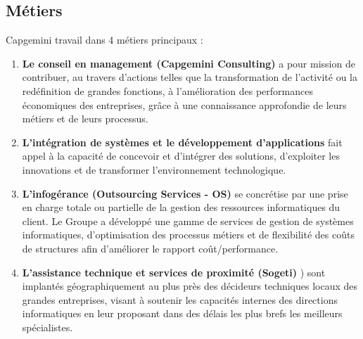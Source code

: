 \subsection{Métiers}
Capgemini travail dans 4 métiers principaux :
\\
\begin{enumerate}
\item \textbf{Le conseil en management (Capgemini Consulting)} a pour mission de contribuer, au travers d’actions telles que la transformation de l’activité ou la redéfinition de grandes fonctions, à l’amélioration des performances économiques des entreprises, grâce à une connaissance approfondie de leurs métiers et de leurs processus.
\item \textbf{L'intégration de systèmes et le développement d'applications} fait appel à la capacité de concevoir et d’intégrer des solutions, d’exploiter les innovations et de transformer l’environnement technologique.
\item \textbf{L’infogérance (Outsourcing Services - OS)} se concrétise par une prise en charge totale ou partielle de la gestion des ressources informatiques du client. Le Groupe a développé une gamme de services de gestion de systèmes informatiques, d’optimisation des processus métiers et de flexibilité des coûts de structures afin d’améliorer le rapport coût/performance.
\item \textbf{L'assistance technique et services de proximité (Sogeti)} ) sont implantés géographiquement au plus près des décideurs techniques locaux des grandes entreprises, visant à soutenir les capacités internes des directions informatiques en leur proposant dans des délais les plus brefs les meilleurs spécialistes.
\end{enumerate}
